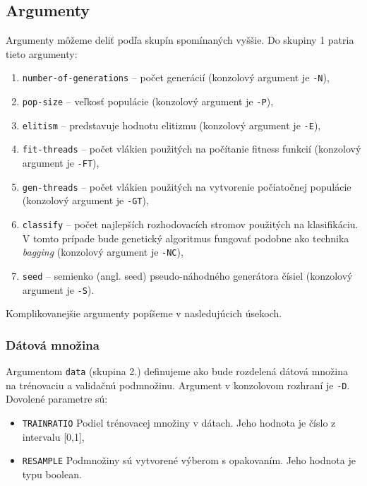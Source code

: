 \subsection{Argumenty}
Argumenty môžeme deliť podľa skupín spomínaných vyššie. Do skupiny 1 patria tieto argumenty:
\begin{enumerate}
\item \texttt{number-of-generations} -- počet generácií (konzolový argument je \verb|-N|),
\item \texttt{pop-size} -- veľkosť populácie (konzolový argument je \verb|-P|),
\item \texttt{elitism} -- predstavuje hodnotu elitizmu (konzolový argument je \verb|-E|),
\item \texttt{fit-threads} -- počet vlákien použitých na počítanie fitness funkcií (konzolový argument je \verb|-FT|),
\item \texttt{gen-threads} -- počet vlákien použitých na vytvorenie počiatočnej populácie (konzolový argument je \verb|-GT|),
\item \texttt{classify} -- počet najlepších rozhodovacích stromov použitých na klasifikáciu. V tomto prípade bude genetický algoritmus fungovať podobne ako technika \emph{bagging} (konzolový argument je \verb|-NC|),
\item \texttt{seed} -- semienko (angl. seed) pseudo-náhodného generátora čísiel (konzolový argument je \verb|-S|).
\end{enumerate}
Komplikovanejšie argumenty popíšeme v nasledujúcich úsekoch.

\subsubsection*{Dátová množina}
Argumentom \verb|data| (skupina 2.) definujeme ako bude rozdelená dátová množina na trénovaciu a validačnú podmnožinu. Argument v konzolovom rozhraní je \verb|-D|.
Dovolené parametre sú:
\begin{itemize}
\item \verb|TRAINRATIO| Podiel trénovacej množiny v dátach. Jeho hodnota je číslo z intervalu [0,1],
\item \verb|RESAMPLE| Podmnožiny sú vytvorené výberom s opakovaním. Jeho hodnota je typu boolean.
\end{itemize}

